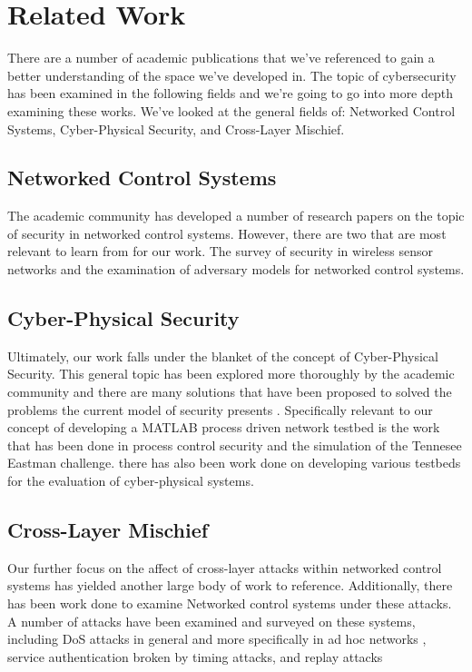 \section{Related Work}
There are a number of academic publications that we've referenced to gain a better understanding of the space we've developed in.  The topic of cybersecurity has been examined in the following fields and we're going to go into more depth examining these works.  We've looked at the general fields of: Networked Control Systems, Cyber-Physical Security, and Cross-Layer Mischief. 
\subsection{Networked Control Systems}
The academic community has developed a number of research papers on the topic of security in networked control systems.  However, there are two that are most relevant to learn from for our work.  The survey of security in wireless sensor networks and the examination of adversary models for networked control systems. \cite{chen,cardenas}
\subsection{Cyber-Physical Security}
Ultimately, our work falls under the blanket of the concept of Cyber-Physical Security.  This general topic has been explored more thoroughly by the academic community and there are many solutions that have been proposed to solved the problems the current model of security presents \cite{mclaughlin, beitollahi, mo}.  Specifically relevant to our concept of developing a MATLAB process driven network testbed is the work that has been done in process control security and the simulation of the Tennesee Eastman challenge.\cite{hashimoto, ricker}  there has also been work done on developing various testbeds for the evaluation of cyber-physical systems.\cite{siaterlis}   
\subsection{Cross-Layer Mischief}
Our further focus on the affect of cross-layer attacks within networked control systems has yielded another large body of work to reference.  Additionally, there has been work done to examine Networked control systems under these attacks.  A number of attacks have been examined and surveyed on these systems, including DoS attacks in general\cite{amin} and more specifically in ad hoc networks \cite{radosavac}, service authentication broken by timing attacks\cite{hayes}, and replay attacks \cite{mosinopoli}